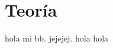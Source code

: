 \documentclass[]{book}
\begin{document}

\chapter*{Teoría}
hola mi bb. jejejej. hola hola
\end{document}
